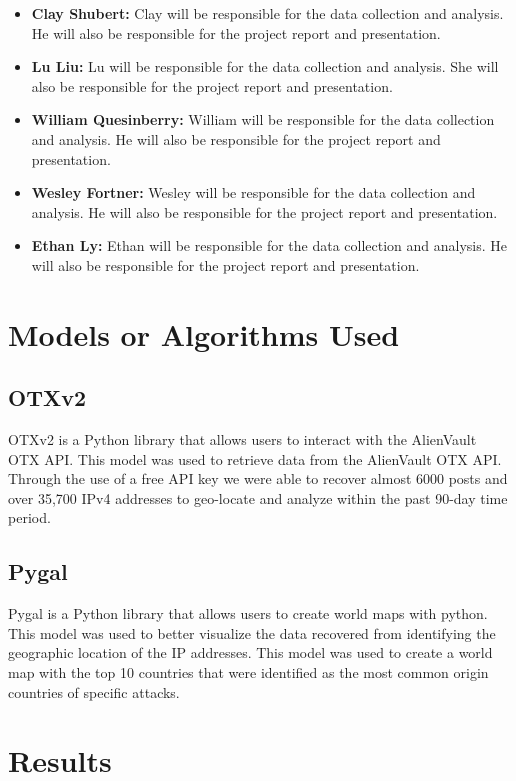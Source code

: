 \documentclass[letterpaper, 10 pt, conference]{ieeeconf}  %
\begin{document}
\begin{itemize}
    \item \textbf{Clay Shubert:} Clay will be responsible for the data collection and analysis. He will also be responsible for the project report and presentation.
    \item \textbf{Lu Liu:} Lu will be responsible for the data collection and analysis. She will also be responsible for the project report and presentation.
    \item \textbf{William Quesinberry:} William will be responsible for the data collection and analysis. He will also be responsible for the project report and presentation.
    \item \textbf{Wesley Fortner:} Wesley will be responsible for the data collection and analysis. He will also be responsible for the project report and presentation.
    \item \textbf{Ethan Ly:} Ethan will be responsible for the data collection and analysis. He will also be responsible for the project report and presentation.
\end{itemize}

\section{Models or Algorithms Used}
    \subsection*{OTXv2}
    OTXv2 is a Python library that allows users to interact with the AlienVault OTX API. This model was used to retrieve data from the AlienVault OTX API. Through the use of a free API key we
    were able to recover almost 6000 posts and over 35,700 IPv4 addresses to geo-locate and analyze within the past 90-day time period.

    \subsection*{Pygal}
    Pygal is a Python library that allows users to create world maps with python. This model was used to better visualize the data recovered from identifying the
    geographic location of the IP addresses. This model was used to create a world map with the top 10 countries that were identified as the most common origin countries of specific attacks.


\section{Results}
\end{document}

